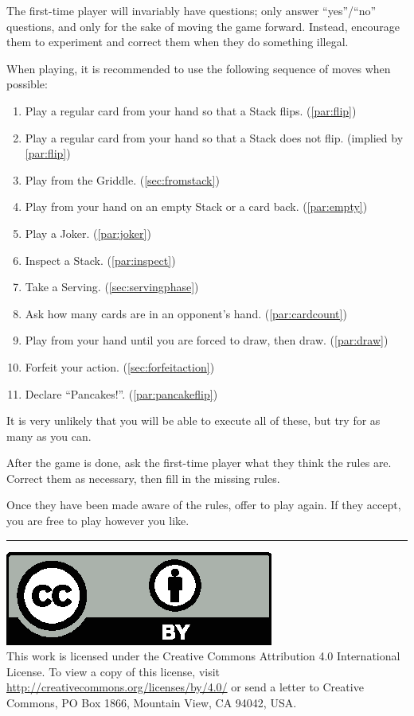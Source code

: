 \documentclass{article}
\newcommand\copyrightfooter{
  \medskip
  \hrule

  {
    \small
    \includegraphics[scale=0.5]{cc-by.eps}\\
    This work is licensed under the Creative Commons Attribution 4.0
    International License. To view a copy of this license, visit
    \url{http://creativecommons.org/licenses/by/4.0/} or send a letter to Creative Commons, PO Box 1866, Mountain View, CA 94042, USA.
  }
}
\begin{document}
The first-time player will invariably have questions; only answer ``yes''/``no'' questions, and only for the sake of moving the game forward. Instead, encourage them to experiment and correct them when they do something illegal.

When playing, it is recommended to use the following sequence of moves when possible:

\begin{enumerate}
  \item Play a regular card from your hand so that a Stack flips. (\autoref{par:flip})
  \item Play a regular card from your hand so that a Stack does not flip. (implied by \autoref{par:flip})
  \item Play from the Griddle. (\autoref{sec:fromstack})
  \item Play from your hand on an empty Stack or a card back. (\autoref{par:empty})
  \item Play a Joker. (\autoref{par:joker})
  \item Inspect a Stack. (\autoref{par:inspect})
  \item Take a Serving. (\autoref{sec:servingphase})
  \item Ask how many cards are in an opponent's hand. (\autoref{par:cardcount})
  \item Play from your hand until you are forced to draw, then draw. (\autoref{par:draw})
  \item Forfeit your action. (\autoref{sec:forfeitaction})
  \item Declare ``Pancakes!''. (\autoref{par:pancakeflip})
\end{enumerate}

It is very unlikely that you will be able to execute all of these, but try for as many as you can.

After the game is done, ask the first-time player what they think the rules are. Correct them as necessary, then fill in the missing rules.

Once they have been made aware of the rules, offer to play again. If they accept, you are free to play however you like.

\copyrightfooter
\end{document}
